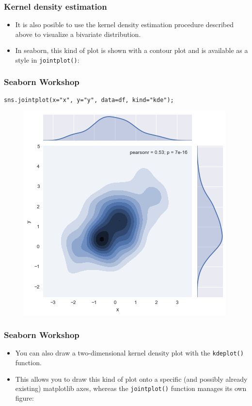 \documentclass{beamer}
\begin{document}
\begin{frame}[fragile]
\frametitle{Kernel density estimation}
\large
\begin{itemize}
\item It is also posible to use the kernel density estimation procedure described above to visualize a bivariate distribution. 
\item In seaborn, this kind of plot is shown with a contour plot and is available as a style in \texttt{jointplot()}:
\end{itemize}

\end{frame}
\begin{frame}[fragile]
\frametitle{Seaborn Workshop}
\large
	\begin{framed}
\begin{verbatim}
sns.jointplot(x="x", y="y", data=df, kind="kde");
\end{verbatim}
\end{framed}
\begin{figure}
\centering
\includegraphics[width=0.55\linewidth]{images/distributions_34_0}
\end{figure}
\end{frame}
\begin{frame}[fragile]
\frametitle{Seaborn Workshop}
\large
	\begin{itemize}
\item You can also draw a two-dimensional kernel density plot with the \texttt{kdeplot()} function.
\item  This allows you to draw this kind of plot onto a specific (and possibly already existing) matplotlib axes, whereas the \texttt{jointplot()} function manages its own figure:
\end{itemize}
\end{frame}
\end{document}
